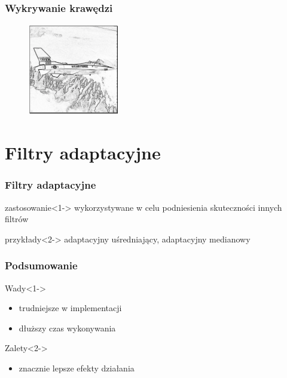\documentclass{beamer}
\begin{document}
\begin{frame}
\frametitle{Wykrywanie krawędzi}
\begin{figure}
\includegraphics[width=150px]{krawedzie_kombinowane}
\end{figure}
\end{frame}
\section{Filtry adaptacyjne}
\begin{frame}
\frametitle{Filtry adaptacyjne}
\begin{block}{zastosowanie}<1->
wykorzystywane w celu podniesienia skuteczności innych filtrów
\end{block}
\begin{block}{przykłady}<2->
adaptacyjny uśredniający, adaptacyjny medianowy
\end{block}
\end{frame}
\begin{frame}
\frametitle{Podsumowanie}
\begin{block}{Wady}<1->
\begin{itemize}
\item trudniejsze w implementacji
\item dłuższy czas wykonywania
\end{itemize}
\end{block}
\begin{block}{Zalety}<2->
\begin{itemize}
\item znacznie lepsze efekty działania
\end{itemize}
\end{block}
\end{frame}
\end{document}
